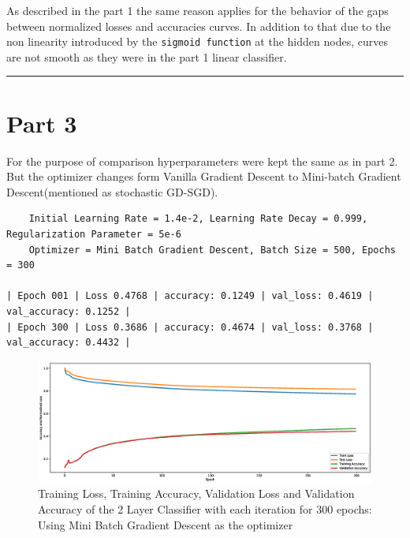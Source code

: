\documentclass[a4paper,11pt]{article}%
\begin{document}
As described in the part 1 the same reason applies for the behavior of the gaps between normalized losses and accuracies curves. In addition to that due to the non linearity introduced by the {\tt sigmoid function} at the hidden nodes, curves are not smooth as they were in the part 1 linear classifier.\\

\hrule
\section*{Part 3}

For the purpose of comparison hyperparameters were kept the same as in part 2. But the optimizer changes form Vanilla Gradient Descent to Mini-batch Gradient Descent(mentioned as stochastic GD-SGD).

\begin{verbatim}
	Initial Learning Rate = 1.4e-2, Learning Rate Decay = 0.999, Regularization Parameter = 5e-6
	Optimizer = Mini Batch Gradient Descent, Batch Size = 500, Epochs = 300
	
| Epoch 001 | Loss 0.4768 | accuracy: 0.1249 | val_loss: 0.4619 | val_accuracy: 0.1252 |
| Epoch 300 | Loss 0.3686 | accuracy: 0.4674 | val_loss: 0.3768 | val_accuracy: 0.4432 |
\end{verbatim}


\begin{figure}[!h]
	\centering
	\includegraphics[scale=0.3]{figures/part3plots}
	\caption{\footnotesize Training Loss, Training Accuracy, Validation Loss and Validation Accuracy of the 2 Layer Classifier with each iteration for 300 epochs: Using Mini Batch Gradient Descent as the optimizer}
\end{figure}
\end{document}
